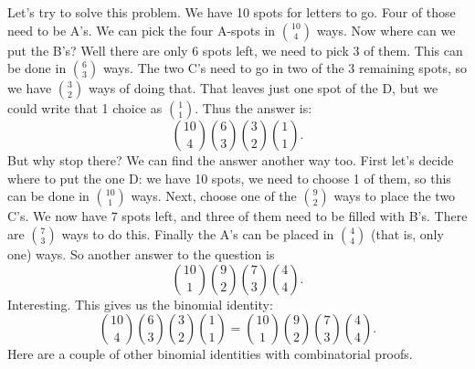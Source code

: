 \documentclass[12pt]{article}
\begin{document}
Let's try to solve this problem.  We have 10 spots for letters to go.  Four of those need to be A's.  We can pick the four A-spots in ${10 \choose 4}$ ways.  Now where can we put the B's?  Well there are only 6 spots left, we need to pick $3$ of them.  This can be done in ${6 \choose 3}$ ways.  The two C's need to go in two of the 3 remaining spots, so we have ${3 \choose 2}$ ways of doing that.  That leaves just one spot of the D, but we could write that 1 choice as ${1 \choose 1}$.  Thus the answer is:
\[{10 \choose 4}{6 \choose 3}{3 \choose 2}{1 \choose 1}.\]
But why stop there?  We can find the answer another way too.  First let's decide where to put the one D: we have 10 spots, we need to choose 1 of them, so this can be done in ${10 \choose 1}$ ways.  Next, choose one of the ${9 \choose 2}$ ways to place the two C's.  We now have $7$ spots left, and three of them need to be filled with B's.  There are ${7 \choose 3}$ ways to do this.  Finally the A's can be placed in ${4 \choose 4}$ (that is, only one) ways.  So another answer to the question is
\[{10 \choose 1}{9 \choose 2}{7 \choose 3}{4 \choose 4}.\]
Interesting.  This gives us the binomial identity:
\[{10 \choose 4}{6 \choose 3}{3 \choose 2}{1 \choose 1} = {10 \choose 1}{9 \choose 2}{7 \choose 3}{4 \choose 4}.\]
Here are a couple of other binomial identities with combinatorial proofs.
\end{document}

